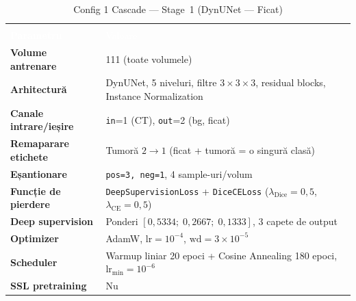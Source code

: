 \documentclass[12pt, a4paper]{report}
\begin{document}
\begin{table}[H]
\centering
\renewcommand{\arraystretch}{1.3}
\caption{Config 1 Cascade — Stage~1 (DynUNet — Ficat)}
\label{tab:config1_stage1}
\begin{tabular}{>{\bfseries}p{5.5cm} p{8.5cm}}
\multicolumn{2}{>{\columncolor{darkblue}}c}{%
    \textbf{\textcolor{white}{Stage 1 — DynUNet (Ficat)}}} \\
\rowcolor{darkblue}
\textcolor{white}{Parametru} & \textcolor{white}{Valoare} \\
\rowcolor{lightblue} Volume antrenare      & 111 (toate volumele) \\
\rowcolor{white}     Arhitectură           & DynUNet, 5 niveluri,
                                             filtre $3\times3\times3$,
                                             residual blocks,
                                             Instance Normalization \\
\rowcolor{lightblue} Canale intrare/ieșire & \texttt{in}=1 (CT),
                                             \texttt{out}=2 (bg, ficat) \\
\rowcolor{white}     Remaparare etichete   & Tumoră $2 \to 1$
                                             (ficat + tumoră = o singură clasă) \\
\rowcolor{lightblue} Eșantionare           & \texttt{pos=3, neg=1},
                                             4 sample-uri/volum \\
\rowcolor{white}     Funcție de pierdere   & \texttt{DeepSupervisionLoss}
                                             + \texttt{DiceCELoss}
                                             ($\lambda_{\text{Dice}}=0{,}5$,
                                              $\lambda_{\text{CE}}=0{,}5$) \\
\rowcolor{lightblue} Deep supervision      & Ponderi $[0{,}5334;\;
                                             0{,}2667;\;0{,}1333]$,
                                             3 capete de output \\
\rowcolor{white}     Optimizer             & AdamW,
                                             $\text{lr}=10^{-4}$,
                                             $\text{wd}=3\times10^{-5}$ \\
\rowcolor{lightblue} Scheduler             & Warmup liniar 20 epoci
                                             + Cosine Annealing 180 epoci,
                                             $\text{lr}_{\min}=10^{-6}$ \\
\rowcolor{white}     SSL pretraining       & Nu \\
\end{tabular}
\end{table}
\end{document}
